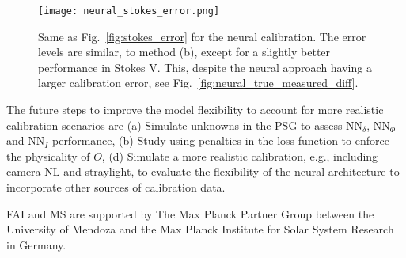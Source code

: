 \documentclass[baaa]{baaa}
\begin{document}
\begin{figure*}[!ht]
    \centering
    \texttt{[image: neural\_stokes\_error.png]}
    \caption{Same as Fig.~\ref{fig:stokes_error} for the neural calibration. The error levels are similar, to method (b), except for a slightly better performance in Stokes V. This, despite the neural approach having a larger calibration error, see Fig.~\ref{fig:neural_true_measured_diff}.}
    \label{fig:neural_stokes_error}
\end{figure*}

The future steps to improve the model flexibility to account for more realistic calibration scenarios are (a) Simulate unknowns in the PSG to assess $\text{NN}_\delta$, $\text{NN}_\Phi$ and $\text{NN}_I$ performance, (b) Study using penalties in the loss function to enforce the physicality of $O$, (d) Simulate a more realistic calibration, e.g., including camera NL and straylight, to evaluate the flexibility of the neural architecture to incorporate other sources of calibration data.

\begin{acknowledgement}
FAI and MS are supported by The Max Planck Partner Group between the University of Mendoza and the Max Planck Institute for Solar System Research in Germany.
\end{acknowledgement}




\small

 
\end{document}
